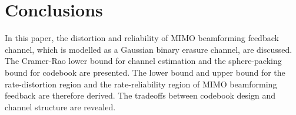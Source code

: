 \documentclass[10pt,fleqn, twocolumn]{IEEEtran}
\begin{document}
\section{Conclusions}
In this paper, the distortion and reliability of MIMO beamforming
feedback channel, which is modelled as a Gaussian binary erasure
channel, are discussed. The Cramer-Rao lower bound for channel
estimation and the sphere-packing bound for codebook are
presented. The lower bound and upper bound for the rate-distortion
region and the rate-reliability region of MIMO beamforming
feedback are therefore derived. The tradeoffs between codebook
design and channel structure are revealed.

\small


\end{document}
